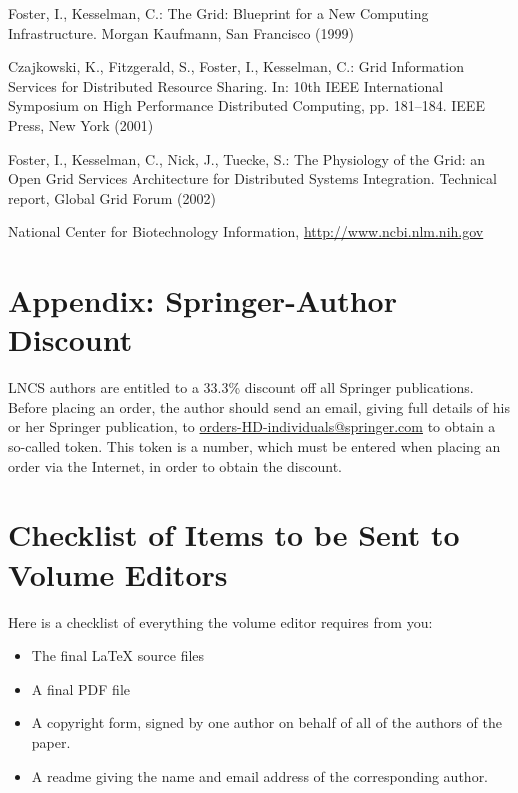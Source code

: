 \documentclass[runningheads,a4paper]{llncs}
\begin{document}
\begin{thebibliography}{4}
 Foster, I., Kesselman, C.: The Grid: Blueprint for a New Computing
Infrastructure. Morgan Kaufmann, San Francisco (1999)

 Czajkowski, K., Fitzgerald, S., Foster, I., Kesselman, C.: Grid
Information Services for Distributed Resource Sharing. In: 10th IEEE
International Symposium on High Performance Distributed Computing, pp.
181--184. IEEE Press, New York (2001)

 Foster, I., Kesselman, C., Nick, J., Tuecke, S.: The Physiology of the
Grid: an Open Grid Services Architecture for Distributed Systems
Integration. Technical report, Global Grid Forum (2002)

 National Center for Biotechnology Information, \url{http://www.ncbi.nlm.nih.gov}

\end{thebibliography}


\section*{Appendix: Springer-Author Discount}

LNCS authors are entitled to a 33.3\% discount off all Springer
publications. Before placing an order, the author should send an email, 
giving full details of his or her Springer publication,
to \url{orders-HD-individuals@springer.com} to obtain a so-called token. This token is a
number, which must be entered when placing an order via the Internet, in
order to obtain the discount.

\section{Checklist of Items to be Sent to Volume Editors}
Here is a checklist of everything the volume editor requires from you:


\begin{itemize}
\settowidth{\leftmargin}{{\Large$\square$}}\advance\leftmargin{}
\itemsep8pt\relax
\renewcommand\labelitemi{{\lower1.5pt\hbox{\Large$\square$}}}

\item The final \LaTeX{} source files
\item A final PDF file
\item A copyright form, signed by one author on behalf of all of the
authors of the paper.
\item A readme giving the name and email address of the
corresponding author.
\end{itemize}
\end{document}
